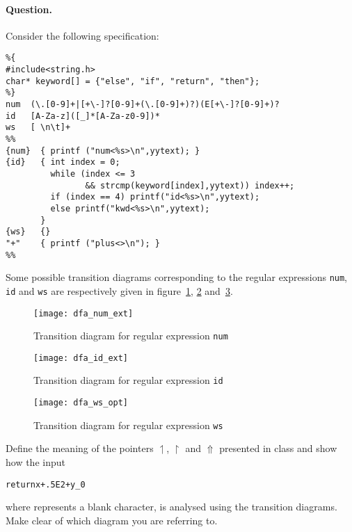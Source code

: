 \paragraph{Question.} Consider the following \Lex specification:
{\small
\begin{verbatim}
%{
#include<string.h>
char* keyword[] = {"else", "if", "return", "then"};
%}
num  (\.[0-9]+|[+\-]?[0-9]+(\.[0-9]+)?)(E[+\-]?[0-9]+)?
id   [A-Za-z]([_]*[A-Za-z0-9])*
ws   [ \n\t]+
%%
{num}  { printf ("num<%s>\n",yytext); }
{id}   { int index = 0;
         while (index <= 3 
                && strcmp(keyword[index],yytext)) index++;
         if (index == 4) printf("id<%s>\n",yytext);
         else printf("kwd<%s>\n",yytext);
       }
{ws}   {}
"+"    { printf ("plus<>\n"); }
%%
\end{verbatim}
}

\noindent Some possible transition diagrams corresponding to the
regular expressions \texttt{num}, \texttt{id} and \texttt{ws} are
respectively given in figure~\ref{num_diagram}, \ref{id_diagram}
and~\ref{ws_diagram}.

\begin{figure}
\begin{center}
\texttt{[image: dfa\_num\_ext]}
\caption{Transition diagram for regular expression \texttt{num}}
\label{num_diagram}
\end{center}
\end{figure}

\begin{figure}
\begin{center}
\texttt{[image: dfa\_id\_ext]}
\caption{Transition diagram for regular expression \texttt{id}}
\label{id_diagram}
\end{center}
\end{figure}

\begin{figure}
\begin{center}
\texttt{[image: dfa\_ws\_opt]}
\caption{Transition diagram for regular expression \texttt{ws}}
\label{ws_diagram}
\end{center}
\end{figure}

\bigskip

Define the meaning of the pointers \(\upharpoonleft\),
\(\upharpoonright\) and \(\Uparrow\) presented in class and show
how the input
{\small
\begin{alltt}
return\textvisiblespace\textvisiblespace{}x+\textvisiblespace{}.5E2+y_0
\end{alltt}
}
\noindent where \textvisiblespace{} represents a blank character, is
analysed using the transition diagrams. Make clear of which diagram
you are referring to.
